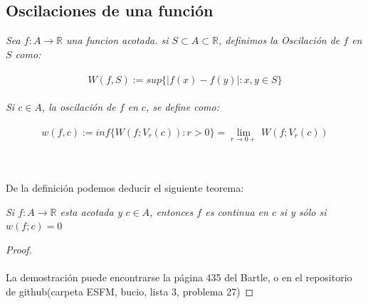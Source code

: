 \documentclass[11pt,letterpaper]{article}
\newcommand{\R}{\mathbb{R}}
\begin{document}
\subsection*{Oscilaciones de una funci\'on}
\begin{tcolorbox}[
	title = \textcolor{black}{\textcolor{white}{Definici\'on}},]
\textit{Sea $f:A\rightarrow \R$ una funcion acotada. si $S\subset A\subset \R$, definimos la Oscilaci\'on de 
$f$ en $S$ como:\,\\
\,\\
\begin{equation*}
        W(f,S):=sup\{|f(x)-f(y)|:x,y\in S\}
\end{equation*}\,\\
Si $c\in A$, la oscilaci\'on de $f$ en $c$, se define como:\,\\
\,\\
\begin{equation*}
    w(f,c):=inf\{W(f;V_r(c)):r>0\}=\lim_{r\rightarrow 0+}\,W(f;V_r(c))
\end{equation*}}
\end{tcolorbox}\,\\
\,\\
De la definici\'on podemos deducir el siguiente teorema:
\begin{tcolorbox}[
	title = \textcolor{black}{\textcolor{white}{Teorema 3}},]
\textit{Si $f:A\rightarrow\R$ esta acotada y $c\in A$, entonces $f$ es continua en $c$ si y s\'olo si $w(f;c)=0$}
\end{tcolorbox}
\begin{proof}\,\\
    \,\\
    La demostraci\'on puede encontrarse la p\'agina 435 del Bartle, o en el repositorio de github(carpeta ESFM, bucio, lista 3, problema 27)
\end{proof}
\newpage
\end{document}
